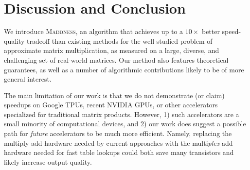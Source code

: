 \documentclass{article}  %
\newcommand{\ours}{\textsc{Maddness}}
\begin{document}
\section{Discussion and Conclusion}
\vspace{-.5mm}

We introduce \ours, an algorithm that achieves up to a $10\times$ better speed-quality tradeoff than existing methods for the well-studied problem of approximate matrix multiplication, as measured on a large, diverse, and challenging set of real-world matrices.
Our method also features theoretical guarantees, as well as a number of algorithmic contributions likely to be of more general interest. %


The main limitation of our work is that we do not demonstrate (or claim) speedups on Google TPUs, recent NVIDIA GPUs, or other accelerators specialized for traditional matrix products. However, 1) such accelerators are a small minority of computational devices, and 2) our work does suggest a possible path for \textit{future} accelerators to be much more efficient. Namely, replacing the multiply-add hardware needed by current approaches with the multi\textit{plex}-add hardware needed for fast table lookups could both save many transistors and likely increase output quality.



\end{document}
